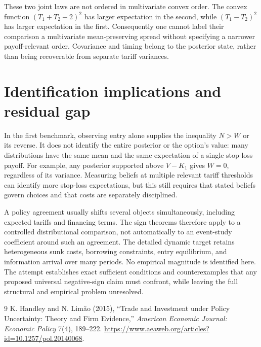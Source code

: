 \documentclass[11pt]{article}
\theoremstyle{definition}
\begin{document}
These two joint laws are not ordered in multivariate convex order. The convex function $(T_1+T_2-2)^2$ has larger expectation in the second, while $(T_1-T_2)^2$ has larger expectation in the first. Consequently one cannot label their comparison a multivariate mean-preserving spread without specifying a narrower payoff-relevant order. Covariance and timing belong to the posterior state, rather than being recoverable from separate tariff variances.

\section*{Identification implications and residual gap}
In the first benchmark, observing entry alone supplies the inequality $N>W$ or its reverse. It does not identify the entire posterior or the option's value: many distributions have the same mean and the same expectation of a single stop-loss payoff. For example, any posterior supported above $V-K_1$ gives $W=0$, regardless of its variance. Measuring beliefs at multiple relevant tariff thresholds can identify more stop-loss expectations, but this still requires that stated beliefs govern choices and that costs are separately disciplined.

A policy agreement usually shifts several objects simultaneously, including expected tariffs and financing terms. The sign theorems therefore apply to a controlled distributional comparison, not automatically to an event-study coefficient around such an agreement. The detailed dynamic target retains heterogeneous sunk costs, borrowing constraints, entry equilibrium, and information arrival over many periods. No empirical magnitude is identified here. The attempt establishes exact sufficient conditions and counterexamples that any proposed universal negative-sign claim must confront, while leaving the full structural and empirical problem unresolved.

\begin{thebibliography}{9}
 K. Handley and N. Lim\~ao (2015), ``Trade and Investment under Policy Uncertainty: Theory and Firm Evidence,'' \emph{American Economic Journal: Economic Policy} 7(4), 189--222. \url{https://www.aeaweb.org/articles?id=10.1257/pol.20140068}.
\end{thebibliography}
\end{document}
